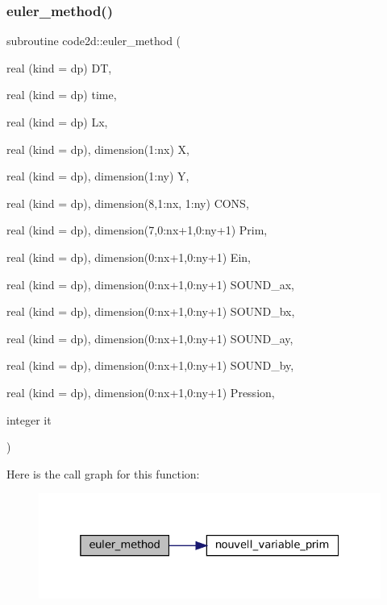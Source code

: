 \mbox{\label{main2Dv1_8f90_a1874243fd0ebdb9c1e1cd78468b4cfac}} 
\subsubsection{\texorpdfstring{euler\+\_\+method()}{euler\_method()}}
{\footnotesize\ttfamily subroutine code2d\+::euler\+\_\+method (\begin{DoxyParamCaption}\item[{real (kind = dp)}]{DT,  }\item[{real (kind = dp)}]{time,  }\item[{real (kind = dp)}]{Lx,  }\item[{real (kind = dp), dimension(1\+:nx)}]{X,  }\item[{real (kind = dp), dimension(1\+:ny)}]{Y,  }\item[{real (kind = dp), dimension(8,1\+:nx, 1\+:ny)}]{C\+O\+NS,  }\item[{real (kind = dp), dimension(7,0\+:nx+1,0\+:ny+1)}]{Prim,  }\item[{real (kind = dp), dimension(0\+:nx+1,0\+:ny+1)}]{Ein,  }\item[{real (kind = dp), dimension(0\+:nx+1,0\+:ny+1)}]{S\+O\+U\+N\+D\+\_\+ax,  }\item[{real (kind = dp), dimension(0\+:nx+1,0\+:ny+1)}]{S\+O\+U\+N\+D\+\_\+bx,  }\item[{real (kind = dp), dimension(0\+:nx+1,0\+:ny+1)}]{S\+O\+U\+N\+D\+\_\+ay,  }\item[{real (kind = dp), dimension(0\+:nx+1,0\+:ny+1)}]{S\+O\+U\+N\+D\+\_\+by,  }\item[{real (kind = dp), dimension(0\+:nx+1,0\+:ny+1)}]{Pression,  }\item[{integer}]{it }\end{DoxyParamCaption})}

Here is the call graph for this function\+:
\nopagebreak
\begin{figure}[H]
\begin{center}
\leavevmode
\includegraphics[width=325pt]{main2Dv1_8f90_a1874243fd0ebdb9c1e1cd78468b4cfac_cgraph}
\end{center}
\end{figure}
\mbox{\label{main2Dv1_8f90_aec66a1d113ade1d60ad864482ea8e4cf}} 

